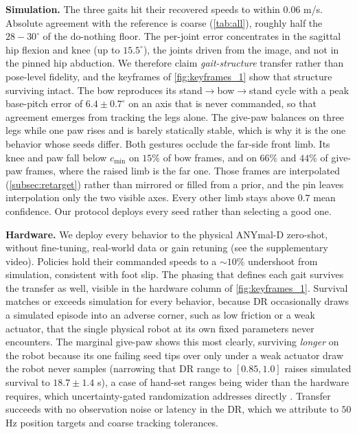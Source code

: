 \documentclass[letterpaper, 10 pt, conference]{ieeeconf}
\begin{document}
\textbf{Simulation.} 
The three gaits hit their recovered speeds to within $0.06$ m/s. Absolute agreement with the reference is coarse (\autoref{tab:all}), roughly half the $28-30^\circ$ of the do-nothing floor. The per-joint error concentrates in the sagittal hip flexion and knee (up to $15.5^\circ$), the joints driven from the image, and not in the pinned hip abduction. We therefore claim \textit{gait-structure} transfer rather than pose-level fidelity, and the keyframes of \autoref{fig:keyframes_1} show that structure surviving intact. The bow reproduces its stand$\to$bow$\to$stand cycle with a peak base-pitch error of $6.4\pm0.7^\circ$ on an axis that is never commanded, so that agreement emerges from tracking the legs alone. The give-paw balances on three legs while one paw rises and is barely statically stable, which is why it is the one behavior whose seeds differ. Both gestures occlude the far-side front limb. Its knee and paw fall below $c_{\min}$ on $15\%$ of bow frames, and on $66\%$ and $44\%$ of give-paw frames, where the raised limb is the far one. Those frames are interpolated (\autoref{subsec:retarget}) rather than mirrored or filled from a prior, and the pin leaves interpolation only the two visible axes. Every other limb stays above $0.7$ mean confidence. Our protocol deploys every seed rather than selecting a good one.





\textbf{Hardware.} We deploy every behavior to the physical ANYmal-D zero-shot, without fine-tuning, real-world data or gain retuning (see the supplementary video). Policies hold their commanded speeds to a ${\sim}10\%$ undershoot from simulation, consistent with foot slip. The phasing that defines each gait survives the transfer as well, visible in the hardware column of \autoref{fig:keyframes_1}. Survival matches or exceeds simulation for every behavior, because DR occasionally draws a simulated episode into an adverse corner, such as low friction or a weak actuator, that the single physical robot at its own fixed parameters never encounters. The marginal give-paw shows this most clearly, surviving \textit{longer} on the robot because its one failing seed tips over only under a weak actuator draw the robot never samples (narrowing that DR range to $[0.85,1.0]$ raises simulated survival to $18.7\pm1.4$ s), a case of hand-set ranges being wider than the hardware requires, which uncertainty-gated randomization addresses directly \cite{danesh2025safe}. 
Transfer succeeds with no observation noise or latency in the DR, which we attribute to $50$ Hz position targets and coarse tracking tolerances.
\end{document}
